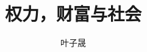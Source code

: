 \documentclass[12pt,heading=true]{book}
\begin{document}
\title{权力，财富与社会}
\author{叶子晟}
\date{}
\maketitle

\tableofcontents


\end{document}
